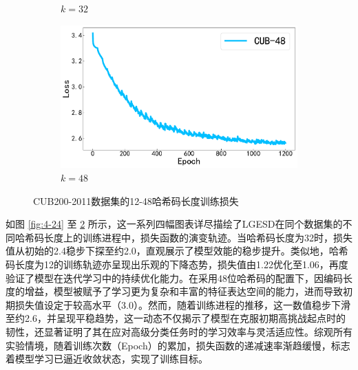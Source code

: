 \begin{figure}[h]
\begin{subfigure}{0.48\textwidth}
    \caption{$k=32$}\label{fig:4-26}
  \end{subfigure}
  \hfil
  \begin{subfigure}{0.48\textwidth}
    \centering
    \includegraphics[width=\linewidth]{./Img/CUB-48.pdf}
    \caption{$k=48$}\label{fig:4-27}
  \end{subfigure}
  \caption{CUB200-2011数据集的12-48哈希码长度训练损失}
  \label{fig:4-28-a}
\end{figure}

如图 \ref{fig:4-24} 至 \ref{fig:4-27} 所示，这一系列四幅图表详尽描绘了LGESD在同个数据集的不同哈希码长度上的训练进程中，损失函数的演变轨迹。当哈希码长度为32时，损失值从初始的2.4稳步下探至约2.0，直观展示了模型效能的稳步提升。类似地，哈希码长度为12的训练轨迹亦呈现出乐观的下降态势，损失值由1.22优化至1.06，再度验证了模型在迭代学习中的持续优化能力。在采用48位哈希码的配置下，因编码长度的增益，模型被赋予了学习更为复杂和丰富的特征表达空间的能力，进而导致初期损失值设定于较高水平（3.0）。然而，随着训练进程的推移，这一数值稳步下滑至约2.6，并呈现平稳趋势，这一动态不仅揭示了模型在克服初期高挑战起点时的韧性，还显著证明了其在应对高级分类任务时的学习效率与灵活适应性。综观所有实验情境，随着训练次数（Epoch）的累加，损失函数的递减速率渐趋缓慢，标志着模型学习已逼近收敛状态，实现了训练目标。

